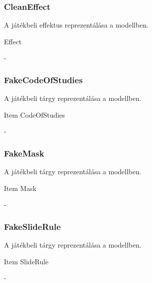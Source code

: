 \subsubsection{CleanEffect}
\begin{class-template-responsibility}
    A játékbeli effektus reprezentálása a modellben.
\end{class-template-responsibility}
\begin{class-template-baseclass}
    Effect
\end{class-template-baseclass}
\begin{class-template-method}
    -
\end{class-template-method}

\subsubsection{FakeCodeOfStudies}
\begin{class-template-responsibility}
    A játékbeli tárgy reprezentálása a modellben.
\end{class-template-responsibility}
\begin{class-template-baseclass}
    Item \baseclass CodeOfStudies
\end{class-template-baseclass}
\begin{class-template-method}
    -
\end{class-template-method}

\subsubsection{FakeMask}
\begin{class-template-responsibility}
    A játékbeli tárgy reprezentálása a modellben.
\end{class-template-responsibility}
\begin{class-template-baseclass}
    Item \baseclass Mask
\end{class-template-baseclass}
\begin{class-template-method}
    -
\end{class-template-method}

\subsubsection{FakeSlideRule}
\begin{class-template-responsibility}
    A játékbeli tárgy reprezentálása a modellben.
\end{class-template-responsibility}
\begin{class-template-baseclass}
    Item \baseclass SlideRule
\end{class-template-baseclass}
\begin{class-template-method}
    -
\end{class-template-method}

